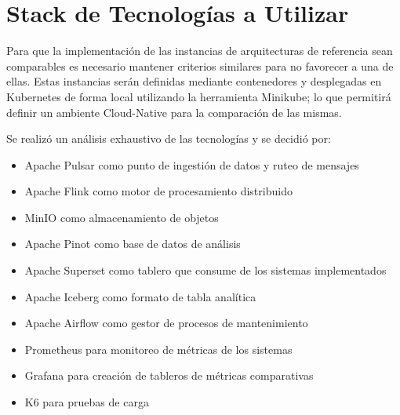 \section{Stack de Tecnologías a Utilizar}

Para que la implementación de las instancias de arquitecturas de referencia sean comparables es necesario mantener criterios similares para no favorecer a una de ellas.
Estas instancias serán definidas mediante contenedores y desplegadas en Kubernetes de forma local utilizando la herramienta Minikube; 
lo que permitirá definir un ambiente Cloud-Native para la comparación de las mismas.

Se realizó un análisis exhaustivo de las tecnologías y se decidió por: 

\begin{itemize}
    \item Apache Pulsar como punto de ingestión de datos y ruteo de mensajes
    \item Apache Flink como motor de procesamiento distribuido
    \item MinIO como almacenamiento de objetos
    \item Apache Pinot como base de datos de análisis
    \item Apache Superset como tablero que consume de los sistemas implementados
    \item Apache Iceberg como formato de tabla analítica
    \item Apache Airflow como gestor de procesos de mantenimiento
    \item Prometheus para monitoreo de métricas de los sistemas
    \item Grafana para creación de tableros de métricas comparativas
    \item K6 para pruebas de carga
\end{itemize}
\newpage